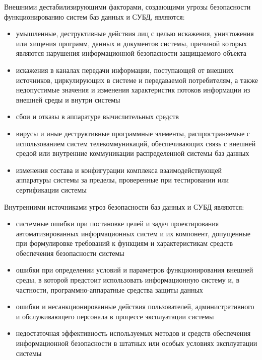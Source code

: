 Внешними дестабилизирующими факторами, создающими угрозы безопасности функционированию систем баз данных и СУБД, являются:
\begin{itemize}
	\item умышленные, деструктивные действия лиц с целью искажения, уничтожения или хищения программ, данных и документов системы, причиной которых являются нарушения информационной безопасности защищаемого объекта
	\item искажения в каналах передачи информации, поступающей от внешних источников, циркулирующих в системе и передаваемой потребителям, а также недопустимые значения и изменения характеристик потоков информации из внешней среды и внутри системы~\label{pon:pot}
	\item сбои и отказы в аппаратуре вычислительных средств
	\item вирусы и иные деструктивные программные элементы, распространяемые с использованием систем телекоммуникаций, обеспечивающих связь с внешней средой или внутренние коммуникации распределенной системы баз данных
	\item изменения состава и конфигурации комплекса взаимодействующей аппаратуры системы за пределы, проверенные при тестировании или сертификации системы
\end{itemize}

Внутренними источниками угроз безопасности баз данных и СУБД являются:
\begin{itemize}
	\item системные ошибки при постановке целей и задач проектирования автоматизированных информационных систем и их компонент, допущенные при формулировке требований к функциям и характеристикам средств обеспечения безопасности системы
	\item ошибки при определении условий и параметров функционирования внешней среды, в которой предстоит использовать информационную систему и, в частности, программно-аппаратные средства защиты данных
	\item ошибки и несанкционированные действия пользователей, административного и обслуживающего персонала в процессе эксплуатации системы
	\item недостаточная эффективность используемых методов и средств обеспечения информационной безопасности в штатных или особых условиях эксплуатации системы
\end{itemize}

